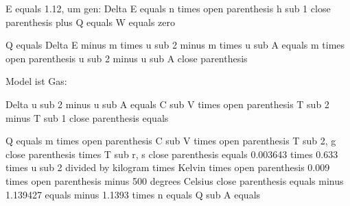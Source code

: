 E equals 1.12, um gen: Delta E equals n times open parenthesis h sub 1 close parenthesis plus Q equals W equals zero

Q equals Delta E minus m times u sub 2 minus m times u sub A equals m times open parenthesis u sub 2 minus u sub A close parenthesis

Model ist Gas:

Delta u sub 2 minus u sub A equals C sub V times open parenthesis T sub 2 minus T sub 1 close parenthesis equals 

Q equals m times open parenthesis C sub V times open parenthesis T sub 2, g close parenthesis times T sub r, s close parenthesis equals 0.003643 times 0.633 times u sub 2 divided by kilogram times Kelvin times open parenthesis 0.009 times open parenthesis minus 500 degrees Celsius close parenthesis equals minus 1.139427 equals minus 1.1393 times n equals Q sub A equals